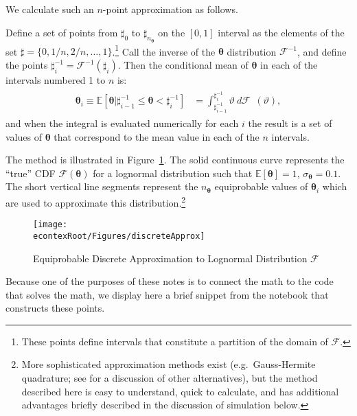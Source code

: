 \documentclass[titlepage, headings=optiontotocandhead]{Resources/texmf-local/tex/latex/econtex}
\begin{document}
We calculate such an $n$-point approximation as follows.

Define a set of points from $\sharp_{0}$ to $\sharp_{n_{\pmb{\theta}}}$ on the $[0,1]$ interval
as the elements of the set $\sharp = \{0,1/n,2/n, \ldots,1\}$.\footnote{These points define intervals that constitute a partition of the domain of $\mathcal{F}$.}  Call the inverse of the $\pmb{\theta}$ distribution $\mathcal{F}^{-1}_{\phantom{\pmb{\theta}}}$, and define the
points $\sharp^{-1}_{i} = \mathcal{F}^{-1}_{\phantom{\pmb{\theta}}}(\sharp_{i})$.  Then
the conditional mean of $\pmb{\theta}$ in each of the intervals numbered 1 to $n$ is:
\begin{equation}\begin{gathered}\begin{aligned}
      \pmb{\theta}_{i} \equiv {\mathbb{E}}[\pmb{\theta} | \sharp_{i-1}^{-1} \leq \pmb{\theta} < \sharp_{i}^{-1}]  & = \int_{\sharp^{-1}_{i-1}}^{\sharp^{-1}_{i}} \vartheta ~ d\mathcal{F}_{\phantom{\pmb{\theta}}}(\vartheta)  ,
    \end{aligned}\end{gathered}\end{equation}
and when the integral is evaluated numerically for each $i$ the result is a set of values of $\pmb{\theta}$ that correspond to the mean value in each of the $n$ intervals.

The method is illustrated in Figure~\ref{fig:discreteapprox}.  The solid continuous curve represents
the ``true'' CDF $\mathcal{F}(\pmb{\theta})$ for a lognormal distribution such that ${\mathbb{E}}[\pmb{\theta}] = 1$, $\sigma_{\pmb{\theta}} = 0.1$.  The short vertical line segments represent the $n_{\pmb{\theta}}$
equiprobable values of $\pmb{\theta}_{i}$ which are used to approximate this
distribution.\footnote{More sophisticated approximation methods exist
  (e.g.\ Gauss-Hermite quadrature; see \cite{kopecky2010finite} for a discussion of other alternatives), but the method described here is easy to understand, quick to calculate, and has additional advantages briefly described in the discussion of simulation below.}
  \hypertarget{discreteApprox}{}
  \begin{figure}
    \texttt{[image: \\econtexRoot/Figures/discreteApprox]}
    \caption{Equiprobable Discrete Approximation to Lognormal Distribution $\mathcal{F}$}
    \label{fig:discreteapprox}
  \end{figure}


Because one of the purposes of these notes is to connect the math to the code that solves the math, we display here a brief snippet from the notebook that constructs these points.
\end{document}
